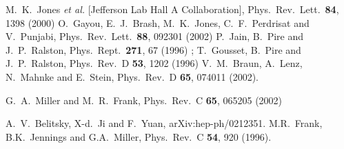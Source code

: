 \begin{thebibliography}{9}
M.~K.~Jones {\it et al.}  [Jefferson Lab Hall A Collaboration],
Phys.\ Rev.\ Lett.\  {\bf 84}, 1398 (2000)
O.~Gayou, E.~J.~Brash, M.~K.~Jones, C.~F.~Perdrisat and V.~Punjabi,
Phys.\ Rev.\ Lett.\  {\bf 88}, 092301 (2002)
P.~Jain, B.~Pire and J.~P.~Ralston,
Phys.\ Rept.\  {\bf 271}, 67 (1996)
;
T.~Gousset, B.~Pire and J.~P.~Ralston,
Phys.\ Rev.\ D {\bf 53}, 1202 (1996)
V.~M.~Braun, A.~Lenz, N.~Mahnke and E.~Stein,
Phys.\ Rev.\ D {\bf 65}, 074011 (2002).


G.~A.~Miller and M.~R.~Frank,
Phys.\ Rev.\ C {\bf 65}, 065205 (2002)

A.~V.~Belitsky, X-d.~Ji and F.~Yuan,
arXiv:hep-ph/0212351.
M.R.~Frank, B.K.~Jennings and G.A.~Miller,
Phys.\ Rev.\ C {\bf 54}, 920 (1996).


\end{thebibliography}
